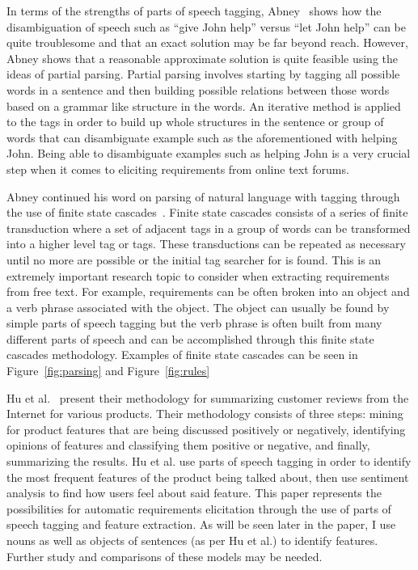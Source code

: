 \documentclass[conference]{IEEEtran}
\begin{document}
In terms of the strengths of parts of speech tagging, Abney~\cite{Abney:1996:PST} shows how
the disambiguation of speech such as ``give John help'' versus ``let John help'' can be quite
troublesome and that an exact solution may be far beyond reach. However, Abney shows that a
reasonable approximate solution is quite feasible using the ideas of partial parsing. Partial
parsing involves starting by tagging all possible words in a sentence and then building
possible relations between those words based on a grammar like structure in the words. An
iterative method is applied to the tags in order to build up whole structures in the sentence
or group of words that can disambiguate example such as the aforementioned with helping John.
Being able to disambiguate examples such as helping John is a very crucial step when it comes
to eliciting requirements from online text forums.

Abney continued his word on parsing of natural language with tagging through the use of
finite state cascades~\cite{Abney:1996:PSC}. Finite state cascades consists of a series of finite
transduction where a set of adjacent tags in a group of words can be transformed into a higher
level tag or tags. These transductions can be repeated as necessary until no more are possible
or the initial tag searcher for is found. This is an extremely important research topic to consider
when extracting requirements from free text. For example, requirements can be often broken into an
object and a verb phrase associated with the object. The object can usually be found by simple
parts of speech tagging but the verb phrase is often built from many different parts
of speech and can be accomplished through this finite state cascades methodology. Examples of 
finite state cascades can be seen in Figure~\ref{fig:parsing} and Figure~\ref{fig:rules}

Hu et al.~\cite{Hu:2004:MSC} present their methodology for summarizing customer reviews from the 
Internet for various products. Their methodology consists of three steps: mining for product
features that are being discussed positively or negatively, identifying opinions of features
and classifying them positive or negative, and finally, summarizing the results. Hu et al. use
parts of speech tagging  in order to identify the most
frequent features of the product being talked about, then use sentiment analysis to find how
users feel about said feature. This paper represents the possibilities for automatic requirements
elicitation through the use of parts of speech tagging and feature extraction. As will be seen
later in the paper, I use nouns as well as objects of sentences (as per Hu et al.) to identify
features. Further study and comparisons of these models may be needed.
\end{document}
